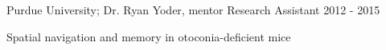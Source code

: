 \begin{cventries}
  \cventry
    {Purdue University; Dr. Ryan Yoder, mentor} %
    {Research Assistant} %
    {} %
    {2012 - 2015} %
    {
      \begin{cvitems} %
        \item {Spatial navigation and memory in otoconia-deficient mice}
      \end{cvitems}
    }    

\end{cventries}
